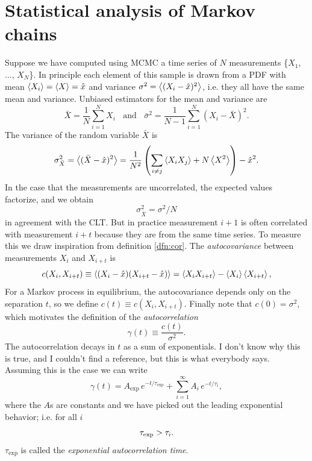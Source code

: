 \section{Statistical analysis of Markov chains}
Suppose we have computed using MCMC a time series of $N$ measurements
\{$X_1$, ..., $X_N$\}. In principle each element of this sample is drawn
from a PDF with mean $\ev{X_i}=\ev{X}=\hat{x}$ and variance 
$\sigma^2=\ev{(X_i-\hat{x})^2}$, i.e. they all have the same mean
and variance. Unbiased estimators for the mean and variance are
\begin{equation}\label{eq:umv}
  \bar{X}=\frac{1}{N}\sum_{i=1}^N X_i
  ~~~~\text{and}~~~~
  \bar{\sigma}^2=\frac{1}{N-1}\sum_{i=1}^N (X_i-\bar{X})^2.
\end{equation}
The variance of the random variable $\bar{X}$ is
\begin{equation}\label{eq:tsvar}
  \sigma^2_{\bar{X}}=\ev{(\bar{X}-\hat{x})^2}
                    =\frac{1}{N^2}\left(\sum_{i\neq j}\ev{X_iX_j}
                     +N\ev{X^2}\right)-\hat{x}^2.
\end{equation}
In the case that the measurements are uncorrelated, the expected values
factorize, and we obtain
\begin{equation}
  \sigma^2_{\bar{X}}=\sigma^2/N
\end{equation}
in agreement with the CLT. But in practice measurement
$i+1$ is often correlated with measurement $i+t$ because they are from
the same time series. To measure this we draw inspiration from 
definition \eqref{dfn:cor}. 
The {\it autocovariance} between measurements 
$X_i$ and $X_{i+t}$ is
  \begin{equation}\label{dfn:acov}
    c(X_i,X_{i+t})\equiv\ev{(X_i-\hat{x})(X_{i+t}-\hat{x})}
     =\ev{X_iX_{i+t}}-\ev{X_i}\ev{X_{i+t}},
  \end{equation}
For a Markov process in equilibrium, the autocovariance depends only on 
the separation $t$, so we define $c(t)\equiv c(X_i,X_{i+t})$. Finally note that
$c(0)=\sigma^2$, which motivates the definition of the {\it autocorrelation}
\begin{equation}\label{dfn:acor}
  \gamma(t)\equiv\frac{c(t)}{\sigma^2}.
\end{equation}
The autocorrelation decays in $t$ as a sum of exponentials. I don't
know why this is true, and I couldn't find a reference, but this is what
everybody says. Assuming this is the case we can write
\begin{equation}
  \gamma(t)=A_\text{exp}\,e^{-t/\tau_\text{exp}}
            +\sum_{i=1}^\infty A_i\,e^{-t/\tau_i},
\end{equation}
where the $A$s are constants and we have picked out the leading
exponential behavior; i.e. for all $i$
\begin{equation}\index{autocorrelation time!exponential}
  \tau_\text{exp}>\tau_i.
\end{equation}
$\tau_\text{exp}$ is called the {\it exponential autocorrelation time}.

